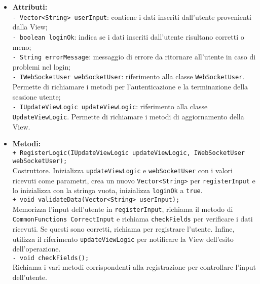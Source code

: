 {{\begin{sloppypar}
{{{\begin{itemize}
				\item[] \textbf{Attributi:}\\
					\texttt{- Vector<String> userInput}: contiene i dati inseriti dall'utente provenienti dalla View;\\

					\texttt{- boolean loginOk}: indica se i dati inseriti dall'utente risultano corretti o meno;\\

					\texttt{- String errorMessage}: messaggio di errore da ritornare all'utente in caso di problemi nel login;\\

					\texttt{- IWebSocketUser webSocketUser}: riferimento alla classe \texttt{WebSocketUser}. Permette di richiamare i metodi per l'autenticazione e la terminazione della sessione utente;\\

					\texttt{- IUpdateViewLogic updateViewLogic}: riferimento alla classe \texttt{UpdateViewLogic}. Permette di richiamare i metodi di aggiornamento della View.\\
			
				\item[] \textbf{Metodi:}\\
					\texttt{+ RegisterLogic(IUpdateViewLogic updateViewLogic, IWebSocketUser webSocketUser);}\\
					Costruttore. Inizializza \texttt{updateViewLogic} e \texttt{webSocketUser} con i valori ricevuti come parametri, crea un nuovo \texttt{Vector<String>} per \texttt{registerInput} e lo inizializza con la stringa vuota, inizializza \texttt{loginOk} a \texttt{true}.\\

					\texttt{+ void validateData(Vector<String> userInput);}\\
					Memorizza l'input dell'utente in \texttt{registerInput}, richiama il metodo di \texttt{CommonFunctions CorrectInput} e richiama \texttt{checkFields} per verificare i dati ricevuti. Se questi sono corretti, richiama  per registrare l'utente. Infine, utilizza il riferimento \texttt{updateViewLogic} per notificare la View dell'esito dell'operazione.\\

					\texttt{- void checkFields();}\\	
					Richiama i vari metodi corrispondenti alla registrazione per controllare l'input dell'utente.
				

\end{itemize}}}}
\end{sloppypar}}}
